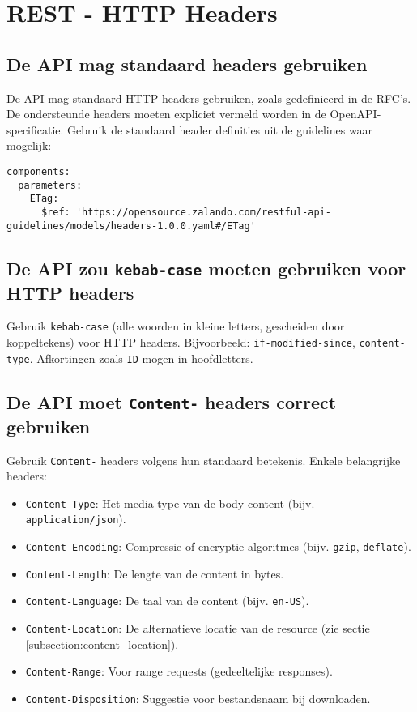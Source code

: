 \section{REST - HTTP Headers}

\subsection{De API mag standaard headers gebruiken}
\label{subsection:standaard_headers}

De API mag standaard HTTP headers gebruiken, zoals gedefinieerd in de RFC's. De ondersteunde headers moeten expliciet vermeld worden in de OpenAPI-specificatie. Gebruik de standaard header definities uit de guidelines waar mogelijk:

\begin{verbatim}
components:
  parameters:
    ETag:
      $ref: 'https://opensource.zalando.com/restful-api-guidelines/models/headers-1.0.0.yaml#/ETag'
\end{verbatim}

\subsection{De API zou \texttt{kebab-case} moeten gebruiken voor HTTP headers}
\label{subsection:kebab_case_headers}

Gebruik \texttt{kebab-case} (alle woorden in kleine letters, gescheiden door koppeltekens) voor HTTP headers. Bijvoorbeeld: \texttt{if-modified-since}, \texttt{content-type}. Afkortingen zoals \texttt{ID} mogen in hoofdletters.

\subsection{De API moet \texttt{Content-\*} headers correct gebruiken}
\label{subsection:content_headers}

Gebruik \texttt{Content-\*} headers volgens hun standaard betekenis. Enkele belangrijke headers:

\begin{itemize}
    \item \texttt{Content-Type}: Het media type van de body content (bijv. \texttt{application/json}).
    \item \texttt{Content-Encoding}: Compressie of encryptie algoritmes (bijv. \texttt{gzip}, \texttt{deflate}).
    \item \texttt{Content-Length}: De lengte van de content in bytes.
    \item \texttt{Content-Language}: De taal van de content (bijv. \texttt{en-US}).
    \item \texttt{Content-Location}: De alternatieve locatie van de resource (zie sectie \ref{subsection:content_location}).
    \item \texttt{Content-Range}: Voor range requests (gedeeltelijke responses).
    \item \texttt{Content-Disposition}: Suggestie voor bestandsnaam bij downloaden.
\end{itemize}

